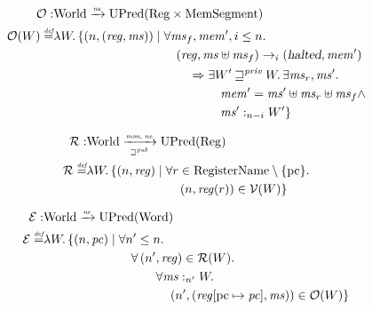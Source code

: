 \documentclass[a4paper]{article}
\newcommand{\update}[2]{[#1 \mapsto #2]}
\newcommand{\nefun}{\xrightarrow{\textit{\tiny{ne}}}}
\newcommand{\defeq}{\stackrel{\textit{\tiny{def}}}{=}}
\newcommand{\var}[1]{\mathit{#1}}
\newcommand{\hs}{\var{ms}}
\newcommand{\ms}{\hs}
\newcommand{\pc}{\mathit{pc}}
\newcommand{\pcreg}{\mathrm{pc}}
\newcommand{\reg}{\var{reg}}
\newcommand{\heap}{\var{mem}}
\newcommand{\halted}{\textsl{halted}}
\newcommand{\futurewk}{\mathbin{\sqsupseteq}^{\var{pub}}}
\newcommand{\futurestr}{\mathbin{\sqsupseteq}^{\var{priv}}}
\newcommand{\heapSat}[3][\heap]{#1 :_{#2} #3}
\newcommand{\monwknefun}{\xrightarrow[\text{\tiny{$\futurewk$}}]{\textit{\tiny{mon, ne}}}}
\newcommand{\asmType}{\plaindom{AsmType}}
\newcommand{\plaindom}[1]{\mathrm{#1}}
\newcommand{\Words}{\plaindom{Word}}
\newcommand{\RegName}{\plaindom{RegisterName}}
\newcommand{\Regs}{\plaindom{Reg}}
\newcommand{\HeapSegments}{\plaindom{MemSegment}}
\newcommand{\Worlds}{\plaindom{World}}
\newcommand{\UPred}[1]{\plaindom{UPred}(#1)}
\newcommand{\intr}[2]{\mathcal{#1}}
\newcommand{\valueintr}[1]{\intr{V}{#1}}
\newcommand{\exprintr}[1]{\intr{E}{#1}}
\newcommand{\regintr}[1]{\intr{R}{#1}}
\newcommand{\stdvr}{\valueintr{\asmType}}
\newcommand{\stder}{\exprintr{\asmType}}
\newcommand{\stdrr}{\regintr{\asmType}}
\newcommand{\observations}{\mathcal{O}}
\newcommand{\npair}[2][n]{\left(#1,#2 \right)}
\newcommand{\step}[1][]{\rightarrow_{#1}}
\begin{document}
\begin{align*}
  \observations : &  \Worlds \nefun \UPred{\Regs \times \HeapSegments} \\
  \observations (W) \defeq & \lambda W \ldotp 
                             \{ \npair{(\reg,\hs)} \mid
                             \begin{aligned}[t]
                               & \forall \ms_f, \heap', i \leq n \ldotp \\
                               & \quad(\reg,\hs \uplus \ms_f) \step[i] (\halted,\heap')  \\
                               & \qquad \Rightarrow
                               \begin{aligned}[t]
                                 & \exists W' \futurestr W \ldotp\exists \hs_r, \hs' \ldotp\\
                                 & \quad \heap' = \hs' \uplus \hs_r \uplus \ms_f \land \\ 
                                 & \quad \heapSat[\hs']{n-i}{W'} \}
                               \end{aligned}
                             \end{aligned}
\end{align*}

\begin{align*}
  \stdrr : & \Worlds \monwknefun \UPred{\Regs} \\
  \stdrr \defeq & \lambda W \ldotp
                  \begin{aligned}[t]
                    \{ \npair{\reg} \mid & \;\forall r \in \RegName \setminus \{\pcreg\} \ldotp \\
                    & \;\quad  \npair{\reg(r)} \in \stdvr(W) \}
                  \end{aligned}
\end{align*}

\begin{align*}
  \stder : & \Worlds \nefun \UPred{\Words} \\
  \stder \defeq & \lambda W \ldotp \{ \npair{\pc} \mid 
                  \begin{aligned}[t]
                    & \forall n' \leq n \ldotp\\
                    & \quad \forall \npair[n']{\reg} \in \stdrr(W) \ldotp \\
                    & \quad \qquad  \forall \heapSat[\hs]{n'}{W} \ldotp \\
                    & \quad \qquad \quad \npair[n']{(\reg\update{\pcreg}{\pc},\hs)} \in \observations(W) \}
                  \end{aligned}
\end{align*}
\end{document}
